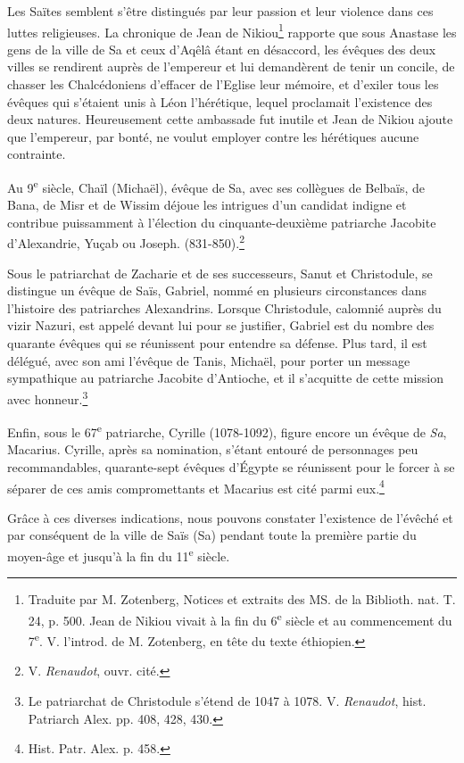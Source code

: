 \documentclass[a4paper, 11pt, oneside]{article}
\begin{document}
Les Saïtes semblent s'être distingués par leur passion et leur violence dans ces luttes religieuses. La chronique de Jean de Nikiou\footnote{Traduite par M. Zotenberg, Notices et extraits des MS. de la Biblioth. nat. T. 24, p. 500. Jean de Nikiou vivait à la fin du 6\textsuperscript{e} siècle et au commencement du 7\textsuperscript{e}. V. l'introd. de M. Zotenberg, en tête du texte éthiopien.} rapporte que sous Anastase les gens de la ville de Sa et ceux d'Aqêlâ étant en désaccord, les évêques des deux villes se rendirent auprès de l'empereur et lui demandèrent de tenir un concile, de chasser les Chalcédoniens d'effacer de l'Eglise leur mémoire, et d'exiler tous les évêques qui s'étaient unis à Léon l'hérétique, lequel proclamait l'existence des deux natures. Heureusement cette ambassade fut inutile et Jean de Nikiou ajoute que l'empereur, par bonté, ne voulut employer contre les hérétiques aucune contrainte.

Au 9\textsuperscript{e} siècle, Chaïl (Michaël), évêque de Sa, avec ses collègues de Belbaïs, de Bana, de Misr et de Wissim déjoue les intrigues d'un candidat indigne et contribue puissamment à l'élection du cinquante-deuxième patriarche Jacobite d'Alexandrie, Yuçab ou Joseph. (831-850).\footnote{V. \emph{Renaudot}, ouvr. cité.}

Sous le patriarchat de Zacharie et de ses successeurs, Sanut et Christodule, se distingue un évêque de Saïs, Gabriel, nommé en plusieurs circonstances dans l'histoire des patriarches Alexandrins. Lorsque Christodule, calomnié auprès du vizir Nazuri, est appelé devant lui pour se justifier, Gabriel est du nombre des quarante évêques qui se réunissent pour entendre sa défense. Plus tard, il est délégué, avec son ami l'évêque de Tanis, Michaël, pour porter un message sympathique au patriarche Jacobite d'Antioche, et il s'acquitte de cette mission avec honneur.\footnote{Le patriarchat de Christodule s'étend de 1047 à 1078. V. \emph{Renaudot}, hist. Patriarch Alex. pp. 408, 428, 430.}

Enfin, sous le 67\textsuperscript{e} patriarche, Cyrille (1078-1092), figure encore un évêque de \emph{Sa}, Macarius. Cyrille, après sa nomination, s'étant entouré de personnages peu recommandables, quarante-sept évêques d'Égypte se réunissent pour le forcer à se séparer de ces amis compromettants et Macarius est cité parmi eux.\footnote{Hist. Patr. Alex. p. 458.}

Grâce à ces diverses indications, nous pouvons constater l'existence de l'évêché et par conséquent de la ville de Saïs (Sa) pendant toute la première partie du moyen-âge et jusqu'à la fin du 11\textsuperscript{e} siècle.
\end{document}
